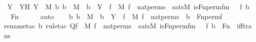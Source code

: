 \begin{isabellebody}
\ Y\ \ YH{\isacharcolon}{\kern0pt}\ {\isachardoublequoteopen}Y\ {\isasymin}\ M{\isachardoublequoteclose}\ {\isachardoublequoteopen}{\isasymAnd}b{\isachardot}{\kern0pt}\ b\ {\isasymin}\ M\ {\isasymLongrightarrow}\ b\ {\isasymin}\ Y\ {\isasymlongleftrightarrow}\ {\isacharparenleft}{\kern0pt}{\isasymexists}f\ {\isasymin}\ M{\isachardot}{\kern0pt}\ f\ {\isasymin}\ nat{\isacharunderscore}{\kern0pt}perms\ {\isasymand}\ sats{\isacharparenleft}{\kern0pt}M{\isacharcomma}{\kern0pt}\ is{\isacharunderscore}{\kern0pt}Fn{\isacharunderscore}{\kern0pt}perm{\isacharprime}{\kern0pt}{\isacharunderscore}{\kern0pt}fm{\isacharparenleft}{\kern0pt}{}{\isacharcomma}{\kern0pt}\ {}{\isacharcomma}{\kern0pt}\ {}{\isacharparenright}{\kern0pt}{\isacharcomma}{\kern0pt}\ {\isacharbrackleft}{\kern0pt}f{\isacharcomma}{\kern0pt}\ b{\isacharbrackright}{\kern0pt}\ {\isacharat}{\kern0pt}\ {\isacharbrackleft}{\kern0pt}Fn{\isacharbrackright}{\kern0pt}{\isacharparenright}{\kern0pt}{\isacharparenright}{\kern0pt}{\isachardoublequoteclose}\isanewline
\ \ \ \ \isamarkupfalse%
\ auto\isanewline
\ \ \isamarkupfalse%
\ {\isachardoublequoteopen}{\isasymAnd}b{\isachardot}{\kern0pt}\ b\ {\isasymin}\ M\ {\isasymLongrightarrow}\ b\ {\isasymin}\ Y\ {\isasymlongleftrightarrow}\ {\isacharparenleft}{\kern0pt}{\isasymexists}f\ {\isasymin}\ M{\isachardot}{\kern0pt}\ f\ {\isasymin}\ nat{\isacharunderscore}{\kern0pt}perms\ {\isasymand}\ b\ {\isacharequal}{\kern0pt}\ Fn{\isacharunderscore}{\kern0pt}perm{\isacharprime}{\kern0pt}{\isacharparenleft}{\kern0pt}f{\isacharparenright}{\kern0pt}{\isacharparenright}{\kern0pt}{\isachardoublequoteclose}\isanewline
\ \ \ \ \isamarkupfalse%
{\isacharparenleft}{\kern0pt}rename{\isacharunderscore}{\kern0pt}tac\ b{\isacharcomma}{\kern0pt}\ rule{\isacharunderscore}{\kern0pt}tac\ Q{\isacharequal}{\kern0pt}{\isachardoublequoteopen}{\isacharparenleft}{\kern0pt}{\isasymexists}f\ {\isasymin}\ M{\isachardot}{\kern0pt}\ f\ {\isasymin}\ nat{\isacharunderscore}{\kern0pt}perms\ {\isasymand}\ sats{\isacharparenleft}{\kern0pt}M{\isacharcomma}{\kern0pt}\ is{\isacharunderscore}{\kern0pt}Fn{\isacharunderscore}{\kern0pt}perm{\isacharprime}{\kern0pt}{\isacharunderscore}{\kern0pt}fm{\isacharparenleft}{\kern0pt}{}{\isacharcomma}{\kern0pt}\ {}{\isacharcomma}{\kern0pt}\ {}{\isacharparenright}{\kern0pt}{\isacharcomma}{\kern0pt}\ {\isacharbrackleft}{\kern0pt}f{\isacharcomma}{\kern0pt}\ b{\isacharbrackright}{\kern0pt}\ {\isacharat}{\kern0pt}\ {\isacharbrackleft}{\kern0pt}Fn{\isacharbrackright}{\kern0pt}{\isacharparenright}{\kern0pt}{\isacharparenright}{\kern0pt}{\isachardoublequoteclose}\ \ iff{\isacharunderscore}{\kern0pt}trans{\isacharparenright}{\kern0pt}\isanewline

\end{isabellebody}
